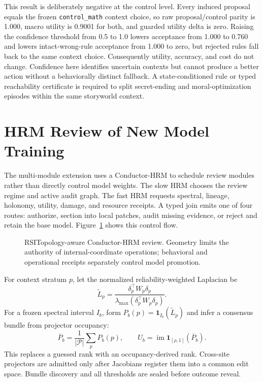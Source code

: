 \documentclass[11pt]{article}
\begin{document}
This result is deliberately negative at the control level. Every induced proposal equals the frozen
\texttt{control\_math} context choice, so raw proposal/control parity is 1.000, macro utility is 0.9001 for both,
and guarded utility delta is zero. Raising the confidence threshold from 0.5 to 1.0 lowers acceptance from 1.000
to 0.760 and lowers intact-wrong-rule acceptance from 1.000 to zero, but rejected rules fall back to the same
context choice. Consequently utility, accuracy, and cost do not change. Confidence here identifies uncertain
contexts but cannot produce a better action without a behaviorally distinct fallback. A state-conditioned rule
or typed reachability certificate is required to split secret-ending and moral-optimization episodes within the
same storyworld context.

\section{HRM Review of New Model Training}

The multi-module extension uses a Conductor-HRM to schedule review modules rather than directly control model
weights. The slow HRM chooses the review regime and active audit graph. The fast HRM requests spectral,
lineage, holonomy, utility, damage, and resource receipts. A typed join emits one of four routes: authorize,
section into local patches, audit missing evidence, or reject and retain the base model. Figure~\ref{fig:hrm-review}
shows this control flow.

\begin{figure}[t]
\centering
\resizebox{\linewidth}{!}{}
\caption{RSITopology-aware Conductor-HRM review. Geometry limits the authority of internal-coordinate operations;
behavioral and operational receipts separately control model promotion.}
\label{fig:hrm-review}
\end{figure}

For context stratum $p$, let the normalized reliability-weighted Laplacian be
\[
\widetilde L_p=\frac{\delta_p^\top W_p\delta_p}
{\lambda_{\max}(\delta_p^\top W_p\delta_p)}.
\]
For a frozen spectral interval $I_b$, form $P_b(p)=\mathbf 1_{I_b}(\widetilde L_p)$ and infer a consensus bundle
from projector occupancy:
\[
\overline P_b=\frac{1}{|\mathcal P|}\sum_pP_b(p),\qquad
U_b=\operatorname{im}\mathbf 1_{[\rho,1]}(\overline P_b).
\]
This replaces a guessed rank with an occupancy-derived rank. Cross-site projectors are admitted only after
Jacobians register them into a common edit space. Bundle discovery and all thresholds are sealed before outcome
reveal.
\end{document}
